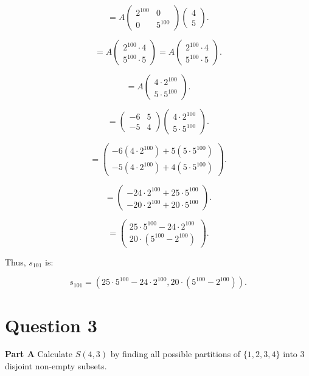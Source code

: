 \documentclass{article}
\begin{document}
	\[ = A \begin{pmatrix} 2^{100} & 0 \\ 0 & 5^{100} \end{pmatrix} \begin{pmatrix} 4 \\ 5 \end{pmatrix}. \]
	
	\[ = A \begin{pmatrix} 2^{100} \cdot 4 \\ 5^{100} \cdot 5 \end{pmatrix} = A \begin{pmatrix} 2^{100} \cdot 4 \\ 5^{100} \cdot 5 \end{pmatrix}. \]
	
	\[ = A \begin{pmatrix} 4 \cdot 2^{100} \\ 5 \cdot 5^{100} \end{pmatrix}. \]
	
	\[ = \begin{pmatrix} -6 & 5 \\ -5 & 4 \end{pmatrix} \begin{pmatrix} 4 \cdot 2^{100} \\ 5 \cdot 5^{100} \end{pmatrix}. \]
	
	\[ = \begin{pmatrix} -6(4 \cdot 2^{100}) + 5(5 \cdot 5^{100}) \\ -5(4 \cdot 2^{100}) + 4(5 \cdot 5^{100}) \end{pmatrix}. \]
	
	\[ = \begin{pmatrix} -24 \cdot 2^{100} + 25 \cdot 5^{100} \\ -20 \cdot 2^{100} + 20 \cdot 5^{100} \end{pmatrix}. \]
	
	\[ = \begin{pmatrix} 25 \cdot 5^{100} - 24 \cdot 2^{100} \\ 20 \cdot (5^{100} - 2^{100}) \end{pmatrix}. \]
	
	Thus, \( s_{101} \) is:
	
	\[ s_{101} = \left( 25 \cdot 5^{100} - 24 \cdot 2^{100}, 20 \cdot (5^{100} - 2^{100}) \right). \]
	
	
	\section{Question 3}
	\textbf{Part A}
	Calculate \( S(4, 3) \) by finding all possible partitions of \(\{1,2,3,4\}\) into 3 disjoint non-empty subsets.
	
\end{document}
